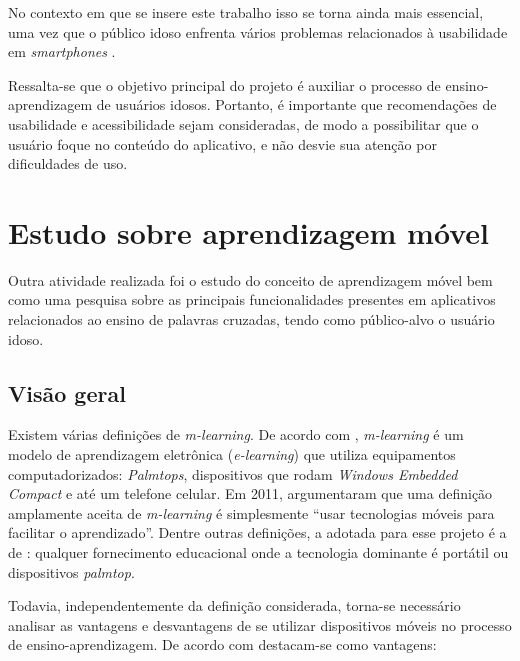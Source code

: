 No contexto em que se insere este trabalho isso se torna ainda mais essencial, uma vez que o público idoso enfrenta vários problemas relacionados à usabilidade em \textit{smartphones} \citep{dificuldadesIdosos}. %


Ressalta-se que o objetivo principal do projeto é auxiliar o processo de ensino-aprendizagem de usuários idosos. Portanto, é importante que recomendações de usabilidade e acessibilidade sejam consideradas, de modo a possibilitar que o usuário foque no conteúdo do aplicativo, e não desvie sua atenção por dificuldades de uso.

\section{Estudo sobre aprendizagem móvel}\label{sec:estudos_ap_movel} 
Outra atividade realizada foi o estudo do conceito de aprendizagem móvel bem como uma pesquisa sobre as principais funcionalidades presentes em aplicativos relacionados ao ensino de palavras cruzadas, tendo como público-alvo o usuário idoso.

\subsection{Visão geral}
Existem várias definições de \textit{m-learning}. %
De acordo com \cite{Quinn2000}, \textit{m-learning} é um modelo de aprendizagem eletrônica (\textit{e-learning}) que utiliza equipamentos computadorizados: \textit{Palmtops}, dispositivos que rodam \textit{Windows Embedded Compact} e até um telefone celular.
Em 2011, \cite{hwang2011research} argumentaram que uma definição amplamente aceita de \textit{m-learning} é simplesmente ``usar tecnologias móveis para facilitar o aprendizado''. Dentre outras definições, a adotada para esse projeto é a de \cite{traxler2005defining}: qualquer fornecimento educacional onde a tecnologia dominante é portátil ou dispositivos \textit{palmtop}.

Todavia, independentemente da definição considerada, torna-se necessário analisar as vantagens e desvantagens de se utilizar dispositivos móveis no processo de ensino-aprendizagem. De acordo com \cite{RICHAMEHTA2016} destacam-se como vantagens: 


